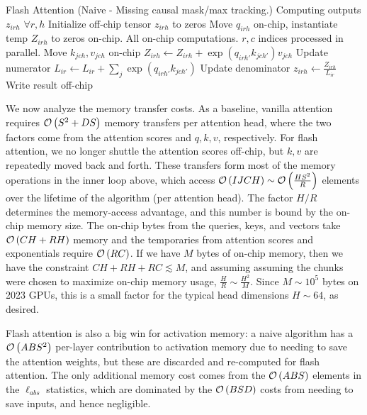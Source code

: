 \begin{algo}{Flash Attention (Naive - Missing causal mask/max tracking.)}
 \Comment Computing outputs $ z _{ irh } $ $ \forall r, h $
\State Initialize off-chip tensor $ z _{ irh }$ to zeros
\State Move  $ q _{ irh }$ on-chip, instantiate temp $Z _{ irh }$ to zeros on-chip.
\Comment All on-chip computations. $ r, c $ indices processed in parallel.
    \State Move  $ k_{ jch },v _{ jch }$ on-chip
    \State $ Z _{ irh } \gets   Z _{ irh } +\exp \left ( q _{ irh' } k _{ jch' }  \right ) v _{ jch }$ \Comment Update numerator
    \State $ L _{ ir } \gets   L _{ ir } +\sum _{ j }\exp \left ( q _{ irh' } k _{ jch' }  \right ) $ \Comment Update denominator
\EndFor
\State $ z _{ irh } \gets \frac{Z _{ irh }}{L _{ ir }}$ \Comment Write result off-chip
\EndFor
\label{algo_fa_fwd_basic}
\end{algo}

We now analyze the memory transfer costs. As a baseline, vanilla attention requires $ \mathcal{O} \left( S
^{ 2 }+ DS \right)  $ memory transfers per attention head, where the two factors come from the
attention scores and $ q, k, v $, respectively.  For flash attention, we no longer shuttle the
attention scores off-chip, but $ k, v $ are repeatedly moved back and forth. These transfers form
most of the memory operations in the inner loop above, which access $ \mathcal{O} \left( IJCH \right) \sim
\mathcal{O} \left( \frac{ HS ^{ 2 } }{ R } \right)$ elements over the lifetime of the algorithm (per
attention head). The factor $ H/R $ determines the memory-access advantage, and this number is bound
by the on-chip memory size. The on-chip bytes from the queries, keys, and vectors take $ \mathcal{O}
\left( CH + RH \right)  $ memory and the temporaries from attention scores and exponentials require
$ \mathcal{O} \left( RC \right)$. If we have $ M $ bytes of on-chip memory, then we have the constraint $
CH + RH + RC \lesssim  M  $, and assuming assuming the chunks were chosen to maximize on-chip memory
usage, $ \frac{ H }{ R } \sim \frac{ H ^{ 2 } }{ M } $. Since $ M \sim 10 ^{ 5 } $ bytes on 2023
GPUs, this is a small factor for the typical head dimensions  $ H \sim 64 $, as desired.

Flash attention is also a big win for activation memory: a naive algorithm has a $ \mathcal{O} \left( ABS
^{ 2 } \right)  $ per-layer contribution to activation memory due to needing to save the attention
weights, but these are discarded and re-computed for flash attention.  The only additional memory
cost comes from the $ \mathcal{O} \left( ABS \right)  $ elements in the $ \ell _{ abs } $ statistics, which are
dominated by the $ \mathcal{O} \left( BSD \right)  $ costs from needing to save inputs, and hence negligible.


